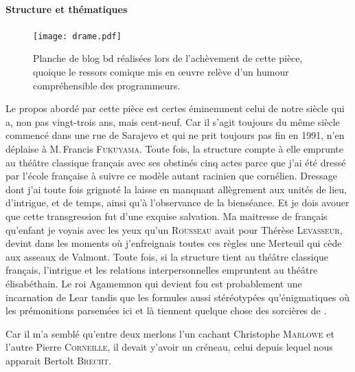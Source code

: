 \paragraph{Structure et thématiques}
\begin{figure}[!t]
	\centering
	\texttt{[image: drame.pdf]}
	\caption{Planche de blog bd réalisées lors de l’achèvement de cette pièce, quoique le ressors comique mis en œuvre relève d’un humour compréhensible des programmeurs.}
\end{figure}
Le  propos abordé par cette pièce est certes éminemment celui de notre siècle qui a, non pas vingt-trois ans, mais cent-neuf. Car il s’agit toujours du même siècle commencé dans une rue de Sarajevo et qui ne prit toujours pas fin en 1991, n’en déplaise à M.\,Francis \textsc{Fukuyama}. Toute fois, la structure compte à elle emprunte au théâtre classique français avec ses obstinés cinq actes parce que j’ai été dressé par l’école française à suivre ce modèle autant racinien que cornélien. Dressage dont j’ai toute fois grignoté la laisse en manquant allègrement aux unités de lieu, d’intrigue, et de temps, ainsi qu’à l’observance de la bienséance. Et je dois avouer que cette transgression fut d’une exquise salvation. Ma maitresse de français qu’enfant je voyais avec les yeux qu’un \textsc{Rousseau} avait pour Thérèse \textsc{Levasseur}, devint dans les moments où j’enfreignais toutes ces règles une Merteuil qui cède aux asseaux de Valmont. Toute fois, si la structure tient au théâtre classique français, l’intrigue et les relations interpersonnelles empruntent au théâtre élisabéthain. Le roi Agamemnon qui devient fou est probablement une incarnation de Lear tandis que les formules aussi stéréotypées qu’énigmatiques où les prémonitions parsemées ici et là tiennent quelque chose des sorcières de .

Car il m’a semblé qu’entre deux merlons l’un cachant Christophe \textsc{Marlowe} et l’autre Pierre \textsc{Corneille}, il devait y’avoir un créneau, celui depuis lequel nous apparait Bertolt \textsc{Brecht}.

